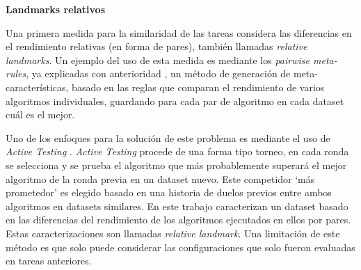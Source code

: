 \quad 

\textbf{Landmarks relativos}


\quad

Una primera medida para la similaridad de las tareas considera las diferencias en el rendimiento relativas (en forma de pares), también llamadas \textit{relative landmarks}. Un ejemplo del uso de esta medida es mediante los \textit{pairwise meta-rules}, ya explicadas con anterioridad \cite{sun2013pairwise}, un método de generación de meta-características, basado en las reglas que comparan el rendimiento de varios algoritmos individuales, guardando para cada par de algoritmo en cada dataset cuál es el mejor.

Uno de los enfoques para la solución de este problema es mediante el uso de \textit{Active Testing} \cite{leite2017selecting}. \textit{Active Testing} procede de una forma tipo torneo, en cada ronda se selecciona y se prueba el algoritmo que más probablemente superará el mejor algoritmo de la ronda previa en un dataset nuevo. Este competidor `más prometedor' es elegido basado en una historia de duelos previos entre ambos algoritmos en datasets similares. En este trabajo \cite{leite2017selecting} caracterizan un dataset basado en las diferencias del rendimiento de los algoritmos ejecutados en ellos por pares. Estas caracterizaciones son llamadas \textit{relative landmark}. Una limitación de este método es que solo puede considerar las configuraciones que solo fueron evaluadas en tareas anteriores.

